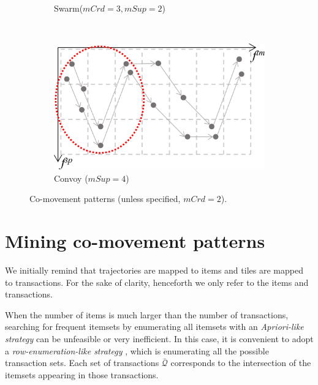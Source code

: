 \documentclass[
]{ceurart}
\begin{document}
\begin{figure}[t]
\begin{subfigure}[t]{.53\columnwidth}
        \caption{Swarm($mCrd=3,mSup=2$)}
        \label{fig:swarm}
    \end{subfigure}~
    \begin{subfigure}[t]{.5\columnwidth}
        \centering
        \includegraphics[scale=.18]{flock.pdf}
        \caption{Convoy ($mSup=4$)}
        \label{fig:flock}
    \end{subfigure}
    \caption{Co-movement patterns (unless specified, $mCrd=2$).}
    \label{fig:allpatterns}
\end{figure}


\section{Mining co-movement patterns}\label{sec:mining}
We initially remind that trajectories are mapped to items and tiles are mapped to transactions.
For the sake of clarity, henceforth we only refer to the items and transactions.

When the number of items is much larger than the number of transactions, searching for frequent itemsets by enumerating all itemsets with an \textit{Apriori-like strategy} \citep{DBLP:conf/vldb/AgrawalS94} can be unfeasible or very inefficient.
In this case, it is convenient to adopt a \textit{row-enumeration-like strategy} \citep{DBLP:conf/kdd/PanCTYZ03}, which is enumerating all the possible transaction sets.
Each set of transactions $\bar{\mathcal{Q}}$ corresponds to the intersection of the itemsets appearing in those transactions.
\end{document}
